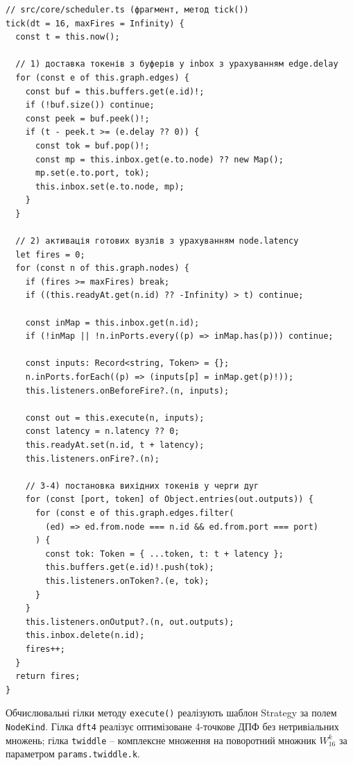 \documentclass[
]{article}
\begin{document}
\begin{verbatim}
// src/core/scheduler.ts (фрагмент, метод tick())
tick(dt = 16, maxFires = Infinity) {
  const t = this.now();

  // 1) доставка токенів з буферів у inbox з урахуванням edge.delay
  for (const e of this.graph.edges) {
    const buf = this.buffers.get(e.id)!;
    if (!buf.size()) continue;
    const peek = buf.peek()!;
    if (t - peek.t >= (e.delay ?? 0)) {
      const tok = buf.pop()!;
      const mp = this.inbox.get(e.to.node) ?? new Map();
      mp.set(e.to.port, tok);
      this.inbox.set(e.to.node, mp);
    }
  }

  // 2) активація готових вузлів з урахуванням node.latency
  let fires = 0;
  for (const n of this.graph.nodes) {
    if (fires >= maxFires) break;
    if ((this.readyAt.get(n.id) ?? -Infinity) > t) continue;

    const inMap = this.inbox.get(n.id);
    if (!inMap || !n.inPorts.every((p) => inMap.has(p))) continue;

    const inputs: Record<string, Token> = {};
    n.inPorts.forEach((p) => (inputs[p] = inMap.get(p)!));
    this.listeners.onBeforeFire?.(n, inputs);

    const out = this.execute(n, inputs);
    const latency = n.latency ?? 0;
    this.readyAt.set(n.id, t + latency);
    this.listeners.onFire?.(n);

    // 3-4) постановка вихідних токенів у черги дуг
    for (const [port, token] of Object.entries(out.outputs)) {
      for (const e of this.graph.edges.filter(
        (ed) => ed.from.node === n.id && ed.from.port === port)
      ) {
        const tok: Token = { ...token, t: t + latency };
        this.buffers.get(e.id)!.push(tok);
        this.listeners.onToken?.(e, tok);
      }
    }
    this.listeners.onOutput?.(n, out.outputs);
    this.inbox.delete(n.id);
    fires++;
  }
  return fires;
}
\end{verbatim}

Обчислювальні гілки методу \texttt{execute()} реалізують шаблон Strategy
за полем \texttt{NodeKind}. Гілка \texttt{dft4} реалізує оптимізоване
4-точкове ДПФ без нетривіальних множень; гілка \texttt{twiddle} --
комплексне множення на поворотний множник \(W_{16}^{k}\) за параметром
\texttt{params.twiddle.k}.
\end{document}
